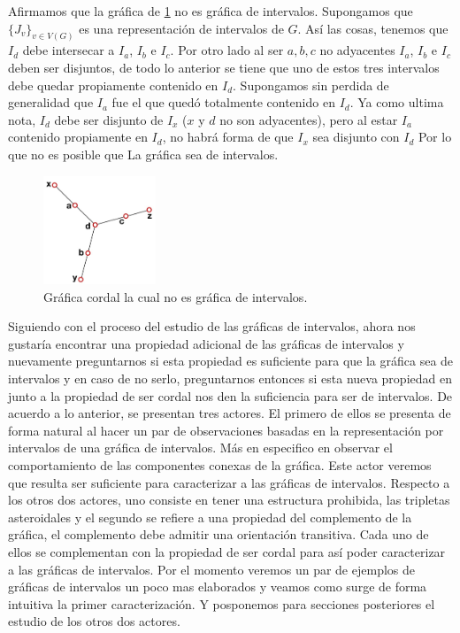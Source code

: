 Afirmamos que la gráfica de \cref{fig:GrafCrdlnodeInt} no es gráfica de intervalos. Supongamos que $ \{ J_v \}_{v\in V(G)}$ es una representación de intervalos de $G$. 
Así las cosas, tenemos que $I_d$ debe intersecar a $I_a$, $I_b$ e $I_c$. Por otro lado al ser $a,b,c$ no adyacentes $I_a$, $I_b$ e $I_c$ deben ser disjuntos, de todo lo anterior se tiene que uno de estos tres intervalos debe quedar propiamente contenido en $I_d$.
Supongamos sin perdida de generalidad que $I_a$ fue el que quedó totalmente contenido en $I_d$. 
Ya como ultima nota, $I_d$ debe ser disjunto de $I_x$  ($x$ y $d$ no son adyacentes), pero al estar $I_a$ contenido propiamente en $I_d$, no habrá forma de que $I_x$ sea disjunto con $I_d$ Por lo que no es posible que La gráfica sea de intervalos.

\begin{figure}[H]
  \centering
  \includegraphics[width=0.3\textwidth]{recursos/capturas/204.jpg}
  \caption{Gráfica cordal la cual no es gráfica de intervalos.}
  \label{fig:GrafCrdlnodeInt}
\end{figure}

Siguiendo con el proceso del estudio de las gráficas de intervalos, ahora nos gustaría encontrar una propiedad adicional de las gráficas de intervalos y nuevamente preguntarnos si esta propiedad es suficiente para que la gráfica sea de intervalos y en caso de no serlo, preguntarnos entonces si esta nueva propiedad en junto a la propiedad de ser cordal nos den la suficiencia para ser de intervalos.
De acuerdo a lo anterior, se presentan tres actores. El primero de ellos se presenta de forma natural al hacer un par de observaciones basadas en la representación por intervalos de una gráfica de intervalos. Más en especifico en observar el comportamiento de las componentes conexas de la gráfica. Este actor veremos que resulta ser suficiente para caracterizar a las gráficas de intervalos. Respecto a los otros dos actores, uno consiste en tener una estructura prohibida, las tripletas asteroidales y el segundo se refiere a una propiedad del complemento de la gráfica, el complemento debe admitir una orientación transitiva. Cada uno de ellos se complementan con la propiedad de ser cordal para así poder caracterizar a las gráficas de intervalos. 
Por el momento veremos un par de ejemplos de gráficas de intervalos un poco mas elaborados y veamos como surge de forma intuitiva la primer caracterización. Y posponemos para secciones posteriores el estudio de los otros dos actores.

